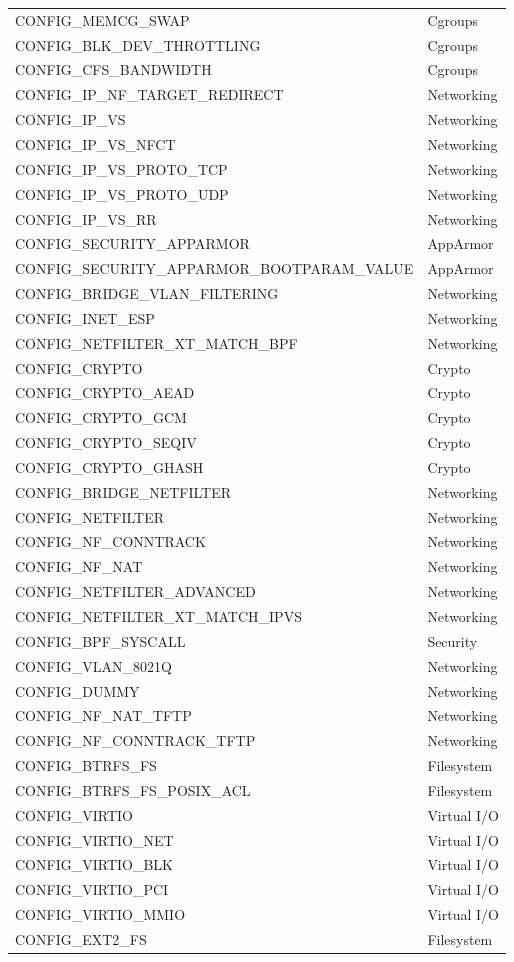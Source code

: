 \documentclass[12pt]{report}
\begin{document}
\begin{doublespace}
\begin{longtable}{|l|l|}
CONFIG\_MEMCG\_SWAP & Cgroups \\
CONFIG\_BLK\_DEV\_THROTTLING & Cgroups \\
CONFIG\_CFS\_BANDWIDTH & Cgroups \\
CONFIG\_IP\_NF\_TARGET\_REDIRECT & Networking \\
CONFIG\_IP\_VS & Networking \\
CONFIG\_IP\_VS\_NFCT & Networking \\
CONFIG\_IP\_VS\_PROTO\_TCP & Networking \\
CONFIG\_IP\_VS\_PROTO\_UDP & Networking \\
CONFIG\_IP\_VS\_RR & Networking \\
CONFIG\_SECURITY\_APPARMOR & AppArmor \\
CONFIG\_SECURITY\_APPARMOR\_BOOTPARAM\_VALUE & AppArmor \\
CONFIG\_BRIDGE\_VLAN\_FILTERING & Networking \\
CONFIG\_INET\_ESP & Networking \\
CONFIG\_NETFILTER\_XT\_MATCH\_BPF & Networking \\
CONFIG\_CRYPTO & Crypto \\
CONFIG\_CRYPTO\_AEAD & Crypto \\
CONFIG\_CRYPTO\_GCM & Crypto \\
CONFIG\_CRYPTO\_SEQIV & Crypto \\
CONFIG\_CRYPTO\_GHASH & Crypto \\
CONFIG\_BRIDGE\_NETFILTER & Networking \\
CONFIG\_NETFILTER & Networking \\
CONFIG\_NF\_CONNTRACK & Networking \\
CONFIG\_NF\_NAT & Networking \\
CONFIG\_NETFILTER\_ADVANCED & Networking \\
CONFIG\_NETFILTER\_XT\_MATCH\_IPVS & Networking \\
CONFIG\_BPF\_SYSCALL & Security \\
CONFIG\_VLAN\_8021Q & Networking \\
CONFIG\_DUMMY & Networking \\
CONFIG\_NF\_NAT\_TFTP & Networking \\
CONFIG\_NF\_CONNTRACK\_TFTP & Networking \\
CONFIG\_BTRFS\_FS & Filesystem \\
CONFIG\_BTRFS\_FS\_POSIX\_ACL & Filesystem \\
CONFIG\_VIRTIO & Virtual I/O \\
CONFIG\_VIRTIO\_NET & Virtual I/O \\
CONFIG\_VIRTIO\_BLK & Virtual I/O \\
CONFIG\_VIRTIO\_PCI & Virtual I/O \\
CONFIG\_VIRTIO\_MMIO & Virtual I/O \\
CONFIG\_EXT2\_FS & Filesystem \\
\hline
\end{longtable}




\end{doublespace}
\end{document}
